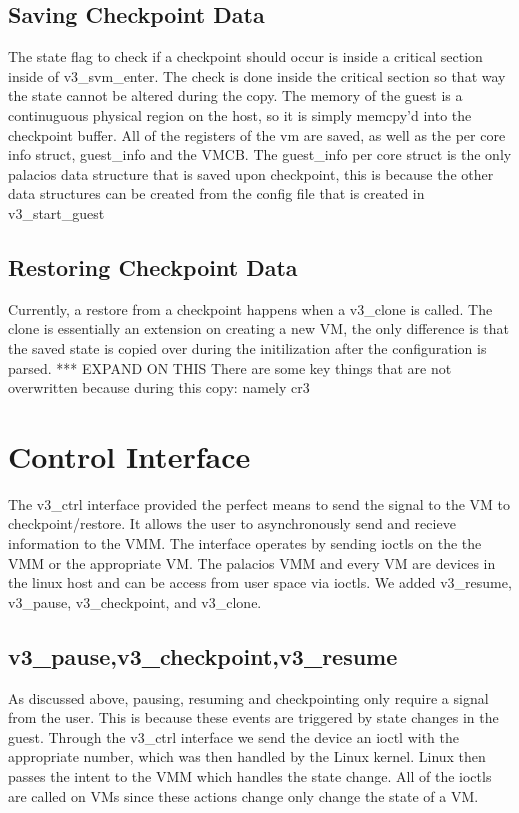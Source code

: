 \documentclass{acm_proc_article-sp}
\begin{document}
\subsection{Saving Checkpoint Data}
The state flag to check if a checkpoint should occur is inside a critical section inside of v3\_svm\_enter. The check is done
inside the critical section so that way the state cannot be altered during the copy.
The memory of the guest is a continuguous physical region on the host, so it is simply memcpy'd into the checkpoint buffer.
All of the registers of the vm are saved, as well as the per core info struct, guest\_info and the VMCB. 
The guest\_info per core struct is the only palacios data structure that is saved upon checkpoint, this is because
the other data structures can be created from the config file that is created in v3\_start\_guest

\subsection{Restoring Checkpoint Data}
Currently, a restore from a checkpoint happens when a v3\_clone is called. The clone is essentially an extension
on creating a new VM, the only difference is that the saved state is copied over during the initilization after 
the configuration is parsed. *** EXPAND ON THIS There are some key things that are not overwritten because during this copy: namely cr3

\section{Control Interface}
The v3\_ctrl interface provided the perfect means to send the signal to the VM to checkpoint/restore.
It allows the user to asynchronously send and recieve information to the VMM. 
The interface operates by sending ioctls on the the VMM or the appropriate VM.
The palacios VMM and every VM are devices in the linux host and can be access from user space via ioctls.
We added v3\_resume, v3\_pause, v3\_checkpoint, and v3\_clone. 
\subsection{v3\_pause,v3\_checkpoint,v3\_resume}
As discussed above, pausing, resuming and checkpointing only require a signal from the user. This is because 
these events are triggered by state changes in the guest. Through the v3\_ctrl interface we send the device an ioctl
with the appropriate number, which was then handled by the Linux kernel. Linux then passes the intent to the VMM which
handles the state change. All of the ioctls are called on VMs since these actions change only change the state of a VM.
\end{document}
